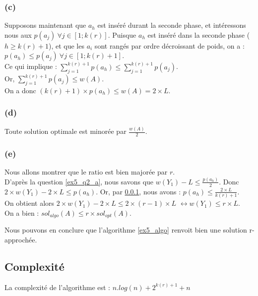 \subsubsection{(c)}\label{ex5_q2_c}
Supposons maintenant que $a_h$ est inséré durant la seconde phase, et intéressons nous aux 
$p(a_j)\ \forall j \in [1;k(r)]$. 
Puisque $a_h$ est inséré dans la seconde phase ($h \geq k(r)+1$), et que les $a_i$ sont
rangés par ordre décroissant de poids, on a : $p(a_h) \leq p(a_j)\ \forall j \in [1;k(r)+1]$.\\
Ce qui implique : $\sum_{j = 1}^{k(r)+1}p(a_h) \leq \sum_{j = 1}^{k(r)+1} p(a_j)$.\\
Or, $\sum_{j=1}^{k(r)+1}p(a_j) \leq w(A)$. \\
On a donc $(k(r)+1) \times p(a_h) \leq w(A) = 2 \times L$.

\subsubsection{(d)}\label{ex5_q2_d}
Toute solution optimale est minorée par $\frac{w(A)}{2}$.

\subsubsection{(e)}\label{ex5_q2_e}
Nous allons montrer que le ratio est bien majorée par $r$.\\
D'après la question \ref{ex5_q2_a}, nous savons que $w(Y_1) - L \leq \frac{p(a_h)}{2}$.
Donc $2 \times w(Y_1) - 2 \times L \leq p(a_h)$.
Or, par \ref{ex5_q2_c}, nous avons : $p(a_h) \leq \frac{2\times L}{k(r)+1}$.\\
On obtient alors $2 \times w(Y_1) - 2 \times L \leq 2 \times (r - 1) \times L$
$\leftrightarrow w(Y_1) \leq r \times L$.\\
On a bien : $sol_{algo}(A) \leq r \times sol_{opt}(A)$.

Nous pouvons en conclure que l'algorithme \ref{ex5_algo} renvoit bien une solution
r-approchée.

\subsection{Complexité}
La complexité de l'algorithme est : $n.log(n) + 2^{k(r)+1} + n$

